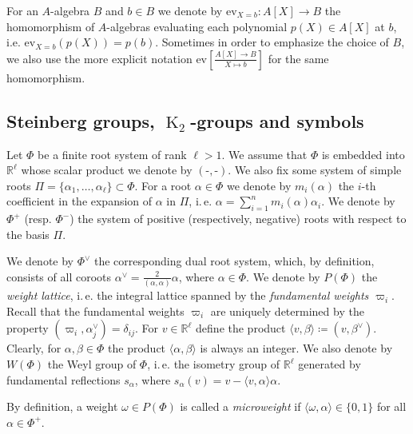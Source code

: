 \documentclass[oneside, 10pt]{amsart}
\DeclareMathOperator{\K}{K}
\newcommand{\eval}[4]{\mathrm{ev} \textstyle \left[\frac{#2[#1] \rightarrow #3}{#1 \mapsto #4}\right]}
\newcommand{\ev}[3]{\eval{X}{#1}{#2}{#3}}
\numberwithin{equation}{section}
\numberwithin{thm}{section}
\numberwithin{lemma}{section}
\theoremstyle{definition}
\theoremstyle{remark}
\begin{document}
For an $A$-algebra $B$ and $b\in B$ we denote by $\mathrm{ev}_{X=b} \colon A[X]\rightarrow B$ the homomorphism of $A$-algebras evaluating each polynomial
$p(X)\in A[X]$ at $b$, i.e. $\mathrm{ev}_{X=b}(p(X)) = p(b)$.
Sometimes in order to emphasize the choice of $B$, we also use the more explicit notation $\ev{A}{B}{b}$ for the same homomorphism.

\subsection{Steinberg groups, $\K_2$-groups and symbols}\label{subsec:steinberg-preliminaries}
Let $\Phi$ be a finite root system of rank $\ell > 1$.
We assume that $\Phi$ is embedded into $\mathbb{R}^\ell$ whose scalar product we denote by $(\text{-}, \text{-})$.
We also fix some system of simple roots $\Pi = \{\alpha_1, \ldots, \alpha_\ell\} \subset \Phi$.
For a root $\alpha\in\Phi$ we denote by $m_i(\alpha)$ the $i$-th coefficient in the expansion of $\alpha$ in $\Pi$,
i.\,e. $\alpha = \sum_{i=1}^n m_i(\alpha) \alpha_i$.
We denote by $\Phi^+$ (resp. $\Phi^-$) the system of positive (respectively, negative) roots with respect to the basis $\Pi$.

We denote by $\Phi^\vee$ the corresponding dual root system, which, by definition, consists of all coroots $\alpha^\vee = \frac{2}{(\alpha, \alpha)} \alpha$, where $\alpha \in \Phi$.
We denote by $P(\Phi)$ the \textit{weight lattice}, i.\,e. the integral lattice spanned by the \emph{fundamental weights $\varpi_i$}.
Recall that the fundamental weights $\varpi_i$ are uniquely determined by the property $(\varpi_i, \alpha_j^\vee) = \delta_{ij}$.
For $v \in \mathbb{R}^\ell$ define the product $\langle v, \beta \rangle \coloneqq (v, \beta^\vee).$
Clearly, for $\alpha,\beta \in \Phi$ the product $\langle \alpha, \beta\rangle$ is always an integer.
We also denote by $W(\Phi)$ the Weyl group of $\Phi$, i.\,e. the isometry group of $\mathbb{R}^\ell$ generated by fundamental reflections $s_\alpha$,
where $s_\alpha(v) = v - \langle v, \alpha\rangle \alpha$.

By definition, a weight $\omega \in P(\Phi)$ is called a \textit{microweight} if $\langle \omega, \alpha \rangle \in \{ 0, 1 \}$ for all $\alpha \in \Phi^+$.
\end{document}
